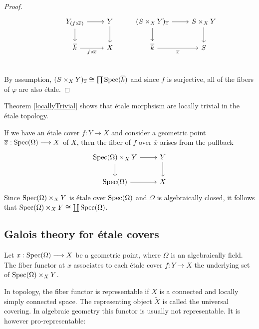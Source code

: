 \begin{proof}
\[\begin{tikzcd}
	& {Y_{(f \circ \overline{x})}} & Y & {(S \times_X Y)_{\overline{x}}} & {S \times_X Y} \\
	& {\overline{k}} & X & {\overline{k}} & S \\
	{}
	\arrow[from=1-3, to=2-3]
	\arrow[from=1-2, to=1-3]
	\arrow["{f \circ \overline{x}}"', from=2-2, to=2-3]
	\arrow[from=1-2, to=2-2]
	\arrow[from=1-4, to=2-4]
	\arrow[from=1-4, to=1-5]
	\arrow[from=1-5, to=2-5]
	\arrow["{\overline{x}}"', from=2-4, to=2-5]
\end{tikzcd}
\]
By assumption, $(S\times_X Y)_{\overline{x}} \cong \prod \operatorname{Spec}(\overline{k})$ and since $f$ is surjective, all of the fibers of $\varphi$ are also \'etale.
\end{proof}
Theorem \ref{locallyTrivial} shows that \'etale morphsism are locally trivial in the \'etale topology.

\begin{remark}
  If we have an \'etale cover $f: Y \to X$ and consider a geometric point $\overline{x} : \operatorname{Spec}(\Omega) \longrightarrow X$ of $X$, then the fiber of $f$ over $\overline{x}$ arises from the pullback
    \[\begin{tikzcd}
    	{\Spec(\Omega)\times_X Y} & Y \\
    	{\Spec(\Omega)} & X
    	\arrow[from=1-1, to=2-1]
    	\arrow[from=1-1, to=1-2]
    	\arrow[from=1-2, to=2-2]
    	\arrow[from=2-1, to=2-2]
    \end{tikzcd}\]
  Since $\operatorname{Spec}(\Omega)\times_X Y$ is \'etale over $\operatorname{Spec}(\Omega)$ and $\Omega$ is algebraically closed, it follows that $\operatorname{Spec}(\Omega)\times_X Y \cong \coprod \operatorname{Spec}(\Omega)$.
\end{remark}

\subsection{Galois theory for \'etale covers}
\begin{definition}
  Let $x: \operatorname{Spec}(\Omega) \longrightarrow X$ be a geometric point, where $\Omega$ is an algebraically field. The fiber functor at $x$ associates to each \'etale cover $f: Y \to X$ the underlying set of $\operatorname{Spec}(\Omega) \times_X Y$.
\end{definition}

\begin{remark}
  In topology, the fiber functor is representable if $X$ is a connected and locally simply connected space. The representing object $\tilde{X}$ is called the universal covering. In algebraic geometry this functor is usually not representable. It is however pro-representable:
\end{remark}


